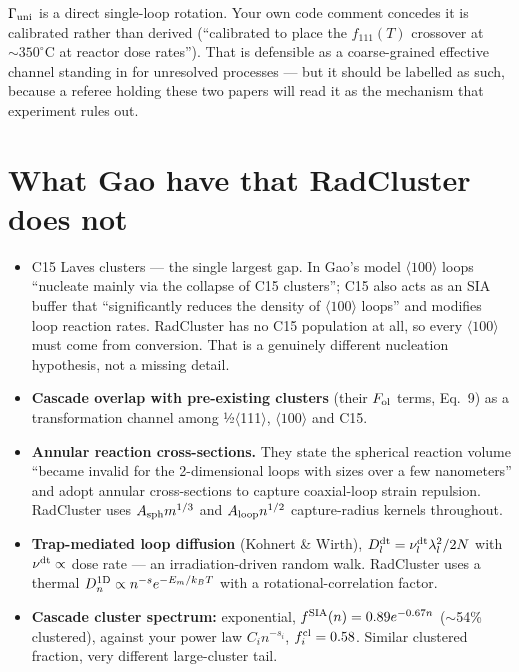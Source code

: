 \documentclass[11pt,a4paper]{article}
\newcommand{\flag}[1]{\textcolor{red!70!black}{#1}}
\begin{document}
$\Gamma_{\rm uni}$ is a direct single-loop rotation. Your own code comment concedes it is
calibrated rather than derived (``calibrated to place the $f_{111}(T)$ crossover at
$\sim\!350^\circ$C at reactor dose rates''). That is defensible as a coarse-grained
effective channel standing in for unresolved processes --- but it should be labelled as
such, because a referee holding these two papers will read it as the mechanism that
experiment rules out.

\section{What Gao have that RadCluster does not}

\begin{itemize}[leftmargin=*,itemsep=1pt,topsep=2pt]
\item \flag{C15 Laves clusters --- the single largest gap.} In Gao's model
$\langle100\rangle$ loops ``nucleate mainly via the collapse of C15 clusters''; C15 also
acts as an SIA buffer that ``significantly reduces the density of $\langle100\rangle$
loops'' and modifies loop reaction rates. RadCluster has no C15 population at all, so every
$\langle100\rangle$ must come from conversion. That is a genuinely different nucleation
hypothesis, not a missing detail.
\item \textbf{Cascade overlap with pre-existing clusters} (their $F_{\rm ol}$ terms,
Eq.~9) as a transformation channel among ½$\langle$111$\rangle$, $\langle100\rangle$ and C15.
\item \textbf{Annular reaction cross-sections.} They state the spherical reaction volume
``became invalid for the 2-dimensional loops with sizes over a few nanometers'' and adopt
annular cross-sections to capture coaxial-loop strain repulsion. RadCluster uses
$A_{\rm sph}m^{1/3}$ and $A_{\rm loop}n^{1/2}$ capture-radius kernels throughout.
\item \textbf{Trap-mediated loop diffusion} (Kohnert \& Wirth), $D^{\rm dt}_l=\nu^{\rm dt}_l\lambda_l^2/2N$
with $\nu^{\rm dt}\propto$ dose rate --- an irradiation-driven random walk. RadCluster uses a
thermal $D^{\rm 1D}_n\propto n^{-s}e^{-E_m/k_BT}$ with a rotational-correlation factor.
\item \textbf{Cascade cluster spectrum:} exponential, $f^{\rm SIA}(n)=0.89e^{-0.67n}$
($\sim$54\% clustered), against your power law $C_in^{-s_i}$, $f^{\rm cl}_i=0.58$. Similar
clustered fraction, very different large-cluster tail.
\end{itemize}
\end{document}
